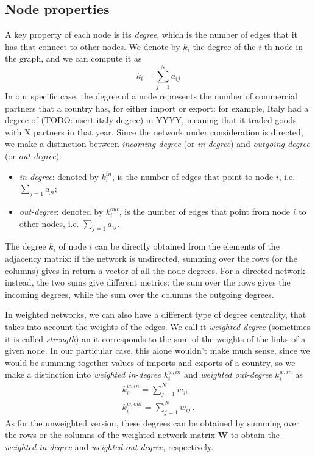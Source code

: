\subsection{Node properties}
A key property of each node is its \textit{degree}, which is the number of edges that it has that connect to other nodes. We denote by $k_i$ the degree of the $i$-th node in the graph, and we can compute it as 
\[
    k_i = \sum_{j=1}^N a_{ij}
\] 
In our specific case, the degree of a node represents the number of commercial partners that a country has, for either import or export: for example, Italy had a degree of (TODO:insert italy degree) in YYYY, meaning that it traded goods with X partners in that year.
Since the network under consideration is directed, we make a distinction between \textit{incoming degree} (or \textit{in-degree}) and \textit{outgoing degree} (or \textit{out-degree}):
\begin{itemize}
    \item \textit{in-degree}: denoted by $k_i^{in}$, is the number of edges that point to node $i$, i.e. $\sum_{j=1} a_{ji}$;
    \item \textit{out-degree}: denoted by $k_i^{out}$, is the number of edges that point from node $i$ to other nodes, i.e. $\sum_{j=1} a_{ij}$.
\end{itemize}
The degree $k_i$ of node $i$ can be directly obtained from the elements of the adjacency matrix: if the network is undirected, summing over the rows (or the columns) gives in return a vector of all the node degrees. For a directed network instead, the two sums give different metrics: the sum over the rows gives the incoming degrees, while the sum over the columns the outgoing degrees.

In weighted networks, we can also have a different type of degree centrality, that takes into account the weights of the edges. We call it \textit{weighted degree} (sometimes it is called \textit{strength}) an it corresponds to the sum of the weights of the links of a given node. In our particular case, this alone wouldn't make much sense, since we would be summing together values of imports and exports of a country, so we make a distinction into \textit{weighted in-degree} $k_i^{w,in}$ and \textit{weighted out-degree} $k_i^{w,in}$ as
\begin{align*}
    k_i^{w,in} = \sum_{j=1}^N w_{ji} \\    
    k_i^{w,out} = \sum_{j=1}^N w_{ij} \,.    
\end{align*}
As for the unweighted version, these degrees can be obtained by summing over the rows or the columns of the weighted network matrix $\mathbf{W}$ to obtain the \textit{weighted in-degree} and \textit{weighted out-degree}, respectively.

